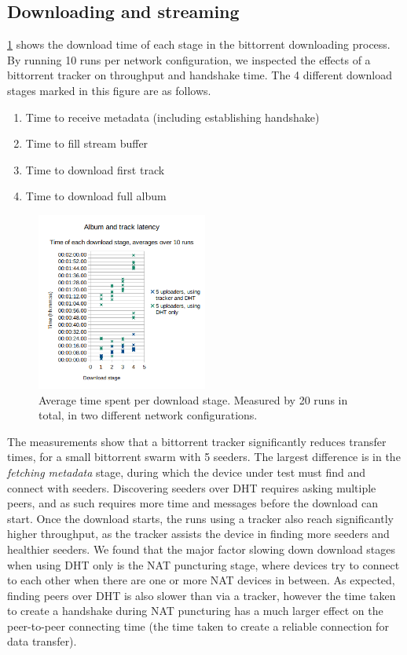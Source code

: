 \subsection{Downloading and streaming}
\ref{fig:download-times} shows the download time of each stage in the bittorrent downloading process. By running 10 runs per network configuration, we inspected the effects of a bittorrent tracker on throughput and handshake time. The 4 different download stages marked in this figure are as follows.
\begin{enumerate}
    \item Time to receive metadata (including establishing handshake)
    \item Time to fill stream buffer
    \item Time to download first track
    \item Time to download full album
\end{enumerate}
\begin{figure}
    \centering
    \includegraphics[width=0.5\textwidth]{evaluation/download-times.png}
    \caption{Average time spent per download stage. Measured by 20 runs in total, in two different network configurations.}
    \label{fig:download-times}
\end{figure}
The measurements show that a bittorrent tracker significantly reduces transfer times, for a small bittorrent swarm with 5 seeders. The largest difference is in the \textit{fetching metadata} stage, during which the device under test must find and connect with seeders. Discovering seeders over DHT requires asking multiple peers, and as such requires more time and messages before the download can start. Once the download starts, the runs using a tracker also reach significantly higher throughput, as the tracker assists the device in finding more seeders and healthier seeders. We found that the major factor slowing down download stages when using DHT only is the NAT puncturing stage, where devices try to connect to each other when there are one or more NAT devices in between. As expected, finding peers over DHT is also slower than via a tracker, however the time taken to create a handshake during NAT puncturing has a much larger effect on the peer-to-peer connecting time (the time taken to create a reliable connection for data transfer). 

